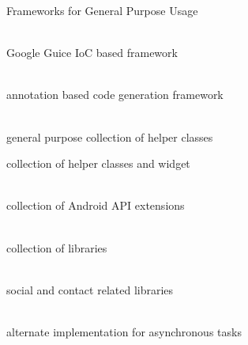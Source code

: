 \documentclass[aspectratio=169]{beamer}
\newcommand{\surl}[1] {{\tiny \url{#1}}}
\begin{document}
    \begin{frame}{Frameworks for General Purpose Usage}
      \begin{description}
        \item<1->[Roboguice \surl{http://roboguice.org}] \hfill \\ Google Guice IoC based framework  
        \item<2->[AndroidAnnotations \surl{http://code.google.com/p/androidannotations/}] \hfill \\ annotation based code generation framework
        \item<3->[DroidFu \surl{http://github.com/kaeppler/droid-fu}] \hfill \\ general purpose collection of helper classes
        \item<4->[CommonsWare Android Components CWAC \surl{https://github.com/commonsguy}] collection of helper classes and widget
        \item<5->[DroidKit \surl{https://github.com/droidkit/droidkit}] \hfill \\ collection of Android API extensions
        \item<6->[Libs for Android \surl{http://code.google.com/p/libs-for-android/}] \hfill \\ collection of libraries
        \item<7->[AndroidLibs \surl{http://www.androidlibs.com/}] \hfill \\ social and contact related libraries
        \item<8->[AndroidAsync \surl{https://bitbucket.org/hal/android-async/}] \hfill \\ alternate implementation for asynchronous tasks  
      \end{description}
    \end{frame}
  
\end{document}

